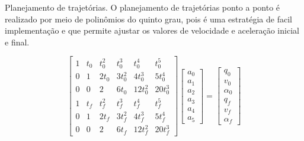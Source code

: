 \documentclass[xcolor=dvipsnames,aspectratio=169]{beamer}
\begin{document}
\begin{frame}{Planejamento de trajetórias.}
    O planejamento de trajetórias ponto a ponto é realizado por meio de polinômios do quinto grau, pois é uma estratégia de facil implementação e que permite ajustar os valores de velocidade e aceleração inicial e final.

    \begin{equation}
        \begin{bmatrix}
            1 & t_0 & t_0^2 & t_0^3  & t_0^4   & t_0^5   \\
            0 & 1   & 2t_0  & 3t_0^2 & 4t_0^3  & 5t_0^4  \\
            0 & 0   & 2     & 6t_0   & 12t_0^2 & 20t_0^3 \\
            1 & t_f & t_f^2 & t_f^3  & t_f^4   & t_f^5   \\
            0 & 1   & 2t_f  & 3t_f^2 & 4t_f^3  & 5t_f^4  \\
            0 & 0   & 2     & 6t_f   & 12t_f^2 & 20t_f^3
        \end{bmatrix}
        \begin{bmatrix}
            a_0 \\
            a_1 \\
            a_2 \\
            a_3 \\
            a_4 \\
            a_5
        \end{bmatrix}
        =
        \begin{bmatrix}
            q_0      \\
            v_0      \\
            \alpha_0 \\
            q_f      \\
            v_f      \\
            \alpha_f
        \end{bmatrix}
    \end{equation}

\end{frame}
\end{document}
